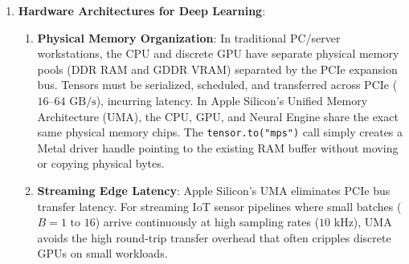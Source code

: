 \begin{enumerate}
    \item \textbf{Hardware Architectures for Deep Learning}:
    \begin{enumerate}[label=(\alph*)]
        \item \textbf{Physical Memory Organization}:
        In traditional PC/server workstations, the CPU and discrete GPU have separate physical memory pools (DDR RAM and GDDR VRAM) separated by the PCIe expansion bus. Tensors must be serialized, scheduled, and transferred across PCIe ($16\text{--}64\text{ GB/s}$), incurring latency. In Apple Silicon's Unified Memory Architecture (UMA), the CPU, GPU, and Neural Engine share the exact same physical memory chips. The \texttt{tensor.to("mps")} call simply creates a Metal driver handle pointing to the existing RAM buffer without moving or copying physical bytes.
        \item \textbf{Streaming Edge Latency}:
        Apple Silicon's UMA eliminates PCIe bus transfer latency. For streaming IoT sensor pipelines where small batches ($B = 1\text{ to }16$) arrive continuously at high sampling rates ($10\text{ kHz}$), UMA avoids the high round-trip transfer overhead that often cripples discrete GPUs on small workloads.
    \end{enumerate}
\end{enumerate}
